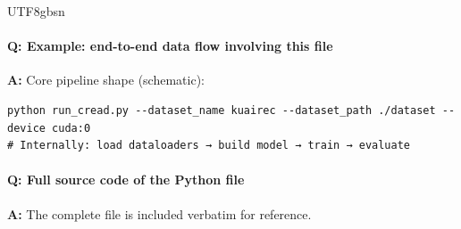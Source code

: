 \documentclass[11pt]{article}
\begin{document}
\begin{CJK*}{UTF8}{gbsn}
\vspace{1mm}


\paragraph{Q: Example: end-to-end data flow involving this file}
\textbf{A:} Core pipeline shape (schematic):

\begin{Verbatim}[fontsize=\small]
python run_cread.py --dataset_name kuairec --dataset_path ./dataset --device cuda:0
# Internally: load dataloaders → build model → train → evaluate
\end{Verbatim}

\paragraph{Q: Full source code of the Python file}
\textbf{A:} The complete file is included verbatim for reference.


\end{CJK*}
\end{document}
